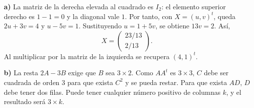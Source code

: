 \textbf{a)} La matriz de la derecha elevada al cuadrado es $I_2$:
el elemento superior derecho es $1-1=0$ y la diagonal vale $1$.
Por tanto, con $X=(u,v)^t$, queda
$2u+3v=4$ y $u-5v=1$. Sustituyendo $u=1+5v$,
se obtiene $13v=2$. Así,
\[
\boxed{X=\begin{pmatrix}23/13\\2/13\end{pmatrix}}.
\]
Al multiplicar por la matriz de la izquierda se recupera $(4,1)^t$.

\textbf{b)} La resta $2A-3B$ exige que $B$ sea $3\times2$.
Como $AA^t$ es $3\times3$, $C$ debe ser cuadrada de orden 3
para que exista $C^2$ y se pueda restar. Para que exista $AD$,
$D$ debe tener dos filas. Puede tener cualquier número positivo
de columnas $k$, y el resultado será $3\times k$.

